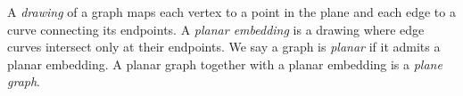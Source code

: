 \documentclass[letterpaper, 12pt]{amsart}
\theoremstyle{definition}
\theoremstyle{definition}
\theoremstyle{thm}
\theoremstyle{definition}
\begin{document}
\begin{comment}
\begin{figure}
\begin{tikzpicture}
	\node (a) at (0cm,0.75cm) {};
	\node (b) at (0.866cm,-0.75cm) {};
	\node (c) at (-0.866cm,-0.75cm) {};
	\node [draw=none, fill=none] (1) at (0cm,-1cm) {};
	\node [draw=none, fill=none] (2) at (0cm,1cm) {};
	\draw (a) -- (b) -- (c) -- (a);
\end{tikzpicture}
$\qquad$
\begin{tikzpicture}
	\node (a) at (0.75cm,0.75cm) {};
	\node (b) at (0.75cm,-0.75cm) {};
	\node (c) at (-0.75cm,-0.75cm) {};
	\node (d) at (-0.75cm,0.75cm) {};
	\node [draw=none, fill=none] (1) at (0cm,-1cm) {};
	\node [draw=none, fill=none] (2) at (0cm,1cm) {};
	\draw (a) -- (b) -- (c) -- (d) -- (a);
	\draw (a) -- (c); \draw (b) -- (d);
\end{tikzpicture}
$\qquad$
\begin{tikzpicture}
	\node (a) at (90:1cm) {};
	\node (b) at (162:1cm) {};
	\node (c) at (234:1cm) {};
	\node (d) at (306:1cm) {};
	\node (e) at (18:1cm) {};
	\node [draw=none, fill=none] (1) at (0cm,-1cm) {};
	\node [draw=none, fill=none] (2) at (0cm,1cm) {};
	\draw (a) -- (b); \draw (a) -- (c); \draw (a) -- (d); \draw (a) -- (e);
	\draw (b) -- (c); \draw (b) -- (d); \draw (b) -- (e); \draw (c) -- (d);
	\draw (c) -- (e); \draw (d) -- (e);
\end{tikzpicture}
$\qquad$
\begin{tikzpicture}
	\node (a) at (0.25cm,1cm) {};
	\node (b) at (-0.25cm,0.25cm) {};
	\node (c) at (0.25cm,-0.25cm) {};
	\node (d) at (-0.25cm,-1cm) {};
	\draw (a) -- (b) -- (c) -- (d);
\end{tikzpicture}
$\qquad$
\begin{tikzpicture}
	\node (a) at (180:1cm) {};
	\node (b) at (120:1cm) {};
	\node (c) at (60:1cm) {};
	\node (d) at (0:1cm) {};
	\node (e) at (300:1cm) {};
	\node (f) at (240:1cm) {};
	\node [draw=none, fill=none] (1) at (0cm,-1cm) {};
	\node [draw=none, fill=none] (2) at (0cm,1cm) {};
	\draw (a) -- (b) -- (c) -- (d) -- (e) -- (f) -- (a);
\end{tikzpicture}

\caption{Drawings of $K_3$, $K_4$, $K_5$, a length $4$ path, and a
	$5$-cycle.}
\end{figure}
\end{comment}

A \textit{drawing} of a graph maps each vertex to a point in the
plane and each edge to a curve connecting its endpoints. A \textit{planar
embedding} is a drawing where edge curves intersect only at their
endpoints. We say a graph is \textit{planar} if it admits a planar embedding. A
planar graph together with a planar embedding is a \textit{plane graph}.
\end{document}
